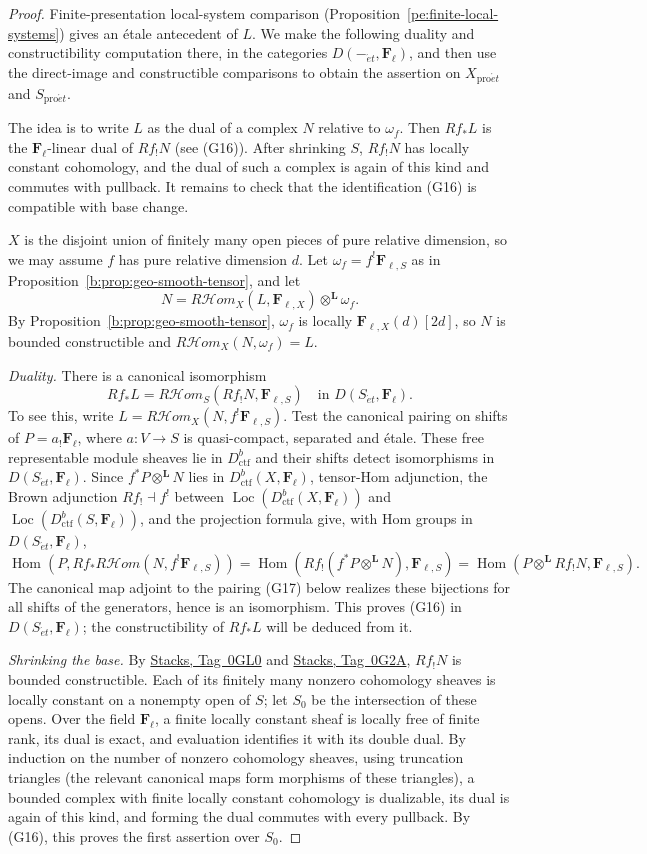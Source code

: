 \documentclass[11pt,a4paper]{article}
\numberwithin{equation}{section}
\theoremstyle{definition}
\theoremstyle{remark}
\newcommand{\cHom}{R\mathcal{H}\!om}
\newcommand{\Loc}{\operatorname{Loc}}
\newcommand{\Fell}{\mathbf F_\ell}
\newcommand{\et}{\acute{e}t}
\newcommand{\proet}{\mathrm{pro}\acute{e}t}
\newcommand{\stacks}[1]{\href{https://stacks.math.columbia.edu/tag/#1}{\textnormal{Stacks, Tag~#1}}}
\newcommand{\Hom}{\operatorname{Hom}}
\newcommand{\Dctf}{D^b_{\mathrm{ctf}}}
\begin{document}
\begin{proof}
Finite-presentation local-system comparison
(Proposition~\ref{pe:finite-local-systems}) gives an \'etale antecedent
of $L$. We make the following duality and constructibility computation
there, in the categories \(D(-_{\et},\Fell)\), and then use the direct-image and constructible comparisons
to obtain the assertion on $X_{\proet}$ and $S_{\proet}$.

The idea is to write \(L\) as the dual of a complex \(N\) relative to
\(\omega_f\). Then \(Rf_*L\) is the \(\Fell\)-linear dual of \(Rf_!N\)
(see (G16)). After shrinking \(S\), \(Rf_!N\) has locally constant
cohomology, and the dual of such a complex is again of this kind and
commutes with pullback. It remains to check that the identification
(G16) is compatible with base change.

\(X\) is the disjoint union of finitely many open pieces of pure
relative dimension, so we may assume \(f\) has pure relative dimension
\(d\). Let \(\omega_f=f^!\mathbf F_{\ell,S}\) as in
Proposition~\ref{b:prop:geo-smooth-tensor}, and let
\[
 N=\cHom_X(L,\mathbf F_{\ell,X})\otimes^{\mathbf L}\omega_f .
\]
By Proposition~\ref{b:prop:geo-smooth-tensor}, \(\omega_f\) is locally
\(\mathbf F_{\ell,X}(d)[2d]\), so \(N\) is bounded constructible and
\(\cHom_X(N,\omega_f)=L\).

\emph{Duality.} There is a canonical isomorphism
\[
 Rf_*L
   = \cHom_S(Rf_!N,\mathbf F_{\ell,S})
   \quad\text{in }D(S_{\et},\Fell).                          \tag{G16}
\]
To see this, write \(L=\cHom_X(N,f^!\mathbf F_{\ell,S})\).
Test the canonical pairing on shifts of $P=a_!\Fell$, where
$a:V\to S$ is quasi-compact, separated and \'etale. These free
representable module sheaves lie in $\Dctf$ and their shifts detect
isomorphisms in $D(S_{\et},\Fell)$. Since
$f^*P\otimes^{\mathbf L}N$ lies in $\Dctf(X,\Fell)$, tensor-Hom
adjunction, the Brown adjunction $Rf_!\dashv f^!$ between
$\Loc(\Dctf(X,\Fell))$ and $\Loc(\Dctf(S,\Fell))$, and the projection
formula give, with Hom groups in $D(S_{\et},\Fell)$,
\[
 \Hom(P,Rf_*\cHom(N,f^!\mathbf F_{\ell,S}))
 =\Hom(Rf_!(f^*P\otimes^{\mathbf L}N),\mathbf F_{\ell,S})
 =\Hom(P\otimes^{\mathbf L}Rf_!N,\mathbf F_{\ell,S}).
\]
The canonical map adjoint to the pairing (G17) below realizes these
bijections for all shifts of the generators, hence is an isomorphism.
This proves (G16) in $D(S_{\et},\Fell)$; the constructibility of
$Rf_*L$ will be deduced from it.

\emph{Shrinking the base.} By \stacks{0GL0} and \stacks{0G2A}, \(Rf_!N\)
is bounded constructible. Each of its finitely many nonzero cohomology
sheaves is locally constant on a nonempty open of \(S\); let \(S_0\) be
the intersection of these opens. Over the field \(\Fell\), a finite
locally constant sheaf is locally free of finite rank, its dual is
exact, and evaluation identifies it with its double dual. By induction
on the number of nonzero cohomology sheaves, using truncation triangles
(the relevant canonical maps form morphisms of these triangles), a
bounded complex with finite locally constant cohomology is dualizable,
its dual is again of this kind, and forming the dual commutes with
every pullback. By (G16), this proves the first assertion over \(S_0\).


\end{proof}
\end{document}
